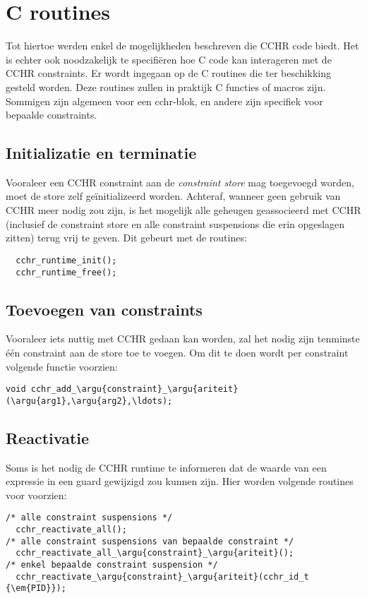 \section{C routines}

Tot hiertoe werden enkel de mogelijkheden beschreven die CCHR code biedt. Het is echter ook noodzakelijk te specifi\"eren hoe C code kan interageren met de CCHR constraints. Er wordt ingegaan op de C routines die ter beschikking gesteld worden. Deze routines zullen in praktijk C functies of macros zijn. Sommigen zijn algemeen voor een cchr-blok, en andere zijn specifiek voor bepaalde constraints.

\subsection{Initializatie en terminatie}

Vooraleer een CCHR constraint aan de {\em constraint store} mag toegevoegd worden, moet de store zelf ge\"initializeerd worden. Achteraf, wanneer geen gebruik van CCHR meer nodig zou zijn, is het mogelijk alle geheugen geassocieerd met CCHR (inclusief de constraint store en alle constraint suspensions die erin opgeslagen zitten) terug vrij te geven. Dit gebeurt met de routines:
\begin{Verbatim}
  cchr_runtime_init();
  cchr_runtime_free();
\end{Verbatim}

\subsection{Toevoegen van constraints}

Vooraleer iets nuttig met CCHR gedaan kan worden, zal het nodig zijn tenminste \'e\'en constraint aan de store toe te voegen. Om dit te doen wordt per constraint volgende functie voorzien: \begin{Verbatim}[commandchars=\\\{\}]
  void cchr_add_\argu{constraint}_\argu{ariteit}(\argu{arg1},\argu{arg2},\ldots);
\end{Verbatim}

\subsection{Reactivatie} \label{sec:crout-reactiv}

Soms is het nodig de CCHR runtime te informeren dat de waarde van een expressie in een guard gewijzigd zou kunnen zijn. Hier worden volgende routines voor voorzien: \begin{Verbatim}[commandchars=\\\{\}]
/* alle constraint suspensions */
  cchr_reactivate_all(); 
/* alle constraint suspensions van bepaalde constraint */
  cchr_reactivate_all_\argu{constraint}_\argu{ariteit}();
/* enkel bepaalde constraint suspension */
  cchr_reactivate_\argu{constraint}_\argu{ariteit}(cchr_id_t {\em{PID}});
\end{Verbatim}

